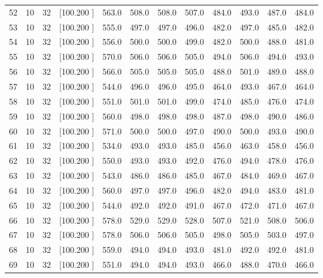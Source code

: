 \documentclass[12pt,a4paper]{article}
\begin{document}
\begin{center}
{\begin{tabular}{r r r r r r r r r r r r}
  52& 10& 32&[100.200   ]&   563.0&   508.0&   508.0&   507.0&   484.0&   493.0&   487.0&   484.0\\[-0.02in]
  53& 10& 32&[100.200   ]&   555.0&   497.0&   497.0&   496.0&   482.0&   497.0&   485.0&   482.0\\[-0.02in]
  54& 10& 32&[100.200   ]&   556.0&   500.0&   500.0&   499.0&   482.0&   500.0&   488.0&   481.0\\[-0.02in]
  55& 10& 32&[100.200   ]&   570.0&   506.0&   506.0&   505.0&   494.0&   506.0&   494.0&   493.0\\[-0.02in]
  56& 10& 32&[100.200   ]&   566.0&   505.0&   505.0&   505.0&   488.0&   501.0&   489.0&   488.0\\[-0.02in]
  57& 10& 32&[100.200   ]&   544.0&   496.0&   496.0&   495.0&   464.0&   493.0&   467.0&   464.0\\[-0.02in]
  58& 10& 32&[100.200   ]&   551.0&   501.0&   501.0&   499.0&   474.0&   485.0&   476.0&   474.0\\[-0.02in]
  59& 10& 32&[100.200   ]&   560.0&   498.0&   498.0&   498.0&   487.0&   498.0&   490.0&   486.0\\[-0.02in]
  60& 10& 32&[100.200   ]&   571.0&   500.0&   500.0&   497.0&   490.0&   500.0&   493.0&   490.0\\[-0.02in]
  61& 10& 32&[100.200   ]&   534.0&   493.0&   493.0&   485.0&   456.0&   463.0&   458.0&   456.0\\[-0.02in]
  62& 10& 32&[100.200   ]&   550.0&   493.0&   493.0&   492.0&   476.0&   494.0&   478.0&   476.0\\[-0.02in]
  63& 10& 32&[100.200   ]&   543.0&   486.0&   486.0&   485.0&   467.0&   484.0&   469.0&   467.0\\[-0.02in]
  64& 10& 32&[100.200   ]&   560.0&   497.0&   497.0&   496.0&   482.0&   494.0&   483.0&   481.0\\[-0.02in]
  65& 10& 32&[100.200   ]&   544.0&   492.0&   492.0&   491.0&   467.0&   472.0&   471.0&   467.0\\[-0.02in]
  66& 10& 32&[100.200   ]&   578.0&   529.0&   529.0&   528.0&   507.0&   521.0&   508.0&   506.0\\[-0.02in]
  67& 10& 32&[100.200   ]&   578.0&   506.0&   506.0&   505.0&   498.0&   505.0&   503.0&   497.0\\[-0.02in]
  68& 10& 32&[100.200   ]&   559.0&   494.0&   494.0&   493.0&   481.0&   492.0&   492.0&   481.0\\[-0.02in]
  69& 10& 32&[100.200   ]&   551.0&   494.0&   494.0&   493.0&   466.0&   488.0&   470.0&   466.0\\[-0.02in]

\end{tabular}}
\end{center}
\end{document}
